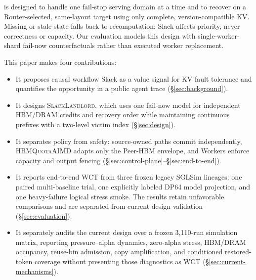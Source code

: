 \system{} is designed to handle one fail-stop serving domain at a time and to
recover on a Router-selected, same-layout target using only complete,
version-compatible KV.  Missing or stale state falls back to recomputation;
Slack affects priority, never correctness or capacity.  Our evaluation models
this design with single-worker-shard fail-now counterfactuals rather than
executed worker replacement.

This paper makes four contributions:

\begin{itemize}
  \item It proposes causal workflow Slack as a value signal for KV fault
  tolerance and quantifies the opportunity in a public agent trace
  (\S\ref{sec:background}).

  \item It designs \textsc{SlackLandlord}, which uses one fail-now model for
  independent HBM/DRAM credits and recovery order while maintaining continuous
  prefixes with a two-level victim index (\S\ref{sec:design}).

  \item It separates policy from safety: source-owned paths commit
  independently, \textsc{HBMQuotaAIMD} adapts only the Peer-HBM envelope, and
  Workers enforce capacity and output fencing
  (\S\ref{sec:control-plane}--\S\ref{sec:end-to-end}).

  \item It reports end-to-end WCT from three frozen legacy SGLSim lineages:
  one paired multi-baseline trial, one explicitly labeled DP64 model
  projection, and one heavy-failure logical stress smoke.  The results retain
  unfavorable comparisons and are separated from current-design validation
  (\S\ref{sec:evaluation}).

  \item It separately audits the current design over a frozen 3,110-run
  simulation matrix, reporting pressure--alpha dynamics, zero-alpha stress,
  HBM/DRAM occupancy, reuse-bin admission, copy amplification, and conditioned
  restored-token coverage without presenting those diagnostics as WCT
  (\S\ref{sec:current-mechanisms}).
\end{itemize}
